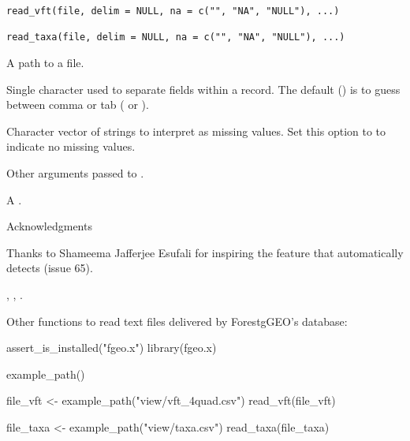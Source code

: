 \documentclass[a4paper]{book}
\begin{document}
%
\begin{Usage}
\begin{verbatim}
read_vft(file, delim = NULL, na = c("", "NA", "NULL"), ...)

read_taxa(file, delim = NULL, na = c("", "NA", "NULL"), ...)
\end{verbatim}
\end{Usage}
%
\begin{Arguments}
\begin{ldescription}
\item[\code{file}] A path to a file.

\item[\code{delim}] Single character used to separate fields within a record. The
default () is to guess between comma or tab ( or ).

\item[\code{na}] Character vector of strings to interpret as missing values. Set this
option to  to indicate no missing values.

\item[\code{...}] Other arguments passed to .
\end{ldescription}
\end{Arguments}
%
\begin{Value}
A .
\end{Value}
%
\begin{Section}{Acknowledgments}

Thanks to Shameema Jafferjee Esufali for inspiring the feature that
automatically detects  (issue 65).
\end{Section}
%
\begin{SeeAlso}\relax
{}, , .

Other functions to read text files delivered by ForestgGEO's database: 
\end{SeeAlso}
%
\begin{Examples}
\begin{ExampleCode}
assert_is_installed("fgeo.x")
library(fgeo.x)

example_path()

file_vft <- example_path("view/vft_4quad.csv")
read_vft(file_vft)

file_taxa <- example_path("view/taxa.csv")
read_taxa(file_taxa)
\end{ExampleCode}
\end{Examples}
\end{document}
